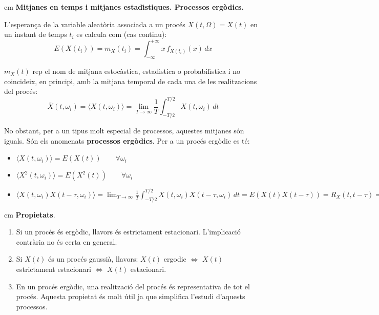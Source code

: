 \documentclass{article}
\begin{document}
 cm
\textbf{\Large Mitjanes en temps i mitjanes estad\'\i stiques. Processos erg\`odics.}

L'esperan\c{c}a de la variable aleat\`oria associada a un proc\'es $X(t, \Omega)=X(t)$ en un instant de temps $t_i$
es calcula com (cas continu):
\[
E(X(t_i))=m_X(t_i)=\int_{-\infty}^{+\infty} x \, f_{X(t_i)} (x) \, dx
\]

$m_X(t)$ rep el nom de mitjana estoc\`astica, estad\'\i stica o probabil\'\i stica i no coincideix, en principi,
amb la mitjana temporal de cada una de les realitzacions del proc\'es:
\[
\bar{X}(t, \omega_i)=\langle X(t, \omega_i) \rangle = \lim_{T \rightarrow \infty} \frac{1}{T} \int_{-T/2}^{T/2} 
X(t, \omega_i) \, dt
\]

No obstant, per a un tipus molt especial de processos, aquestes mitjanes s\'on iguals. S\'on els anomenats 
{\bf processos erg\`odics}. Per a un proc\'es erg\`odic es t\'e:
\begin{itemize}
\item $\langle X(t, \omega_i) \rangle = E(X(t)) \qquad \forall \omega_i$
\item $\langle X^2(t, \omega_i) \rangle = E(X^2(t)) \qquad \forall \omega_i$
\item $\langle X(t, \omega_i) X(t-\tau, \omega_i) \rangle = 
\lim_{T \rightarrow \infty} \frac{1}{T} \int_{-T/2}^{T/2} X(t, \omega_i) X(t-\tau, \omega_i) \, dt =
E(X(t) X(t-\tau))=R_X(t, t-\tau)=R_X(\tau) \qquad \forall \omega_i$
\end{itemize}

 cm
\noindent
{\bf Propietats}.
\begin{enumerate}[1.]
\item Si un proc\'es \'es erg\`odic, llavors \'es estrictament estacionari. L'implicaci\'o contr\`aria no \'es
certa en general.
\item Si $X(t)$ \'es un proc\'es gaussi\`a, llavors: $X(t)$ ergodic $\iff$ $X(t)$ estrictament estacionari $\iff$ 
$X(t)$ estacionari.
\item En un proc\'es erg\`odic, una realitzaci\'o del proc\'es \'es representativa de tot el proc\'es. Aquesta 
propietat \'es molt \'util ja que simplifica l'estudi d'aquests processos.
\end{enumerate}
\end{document}
